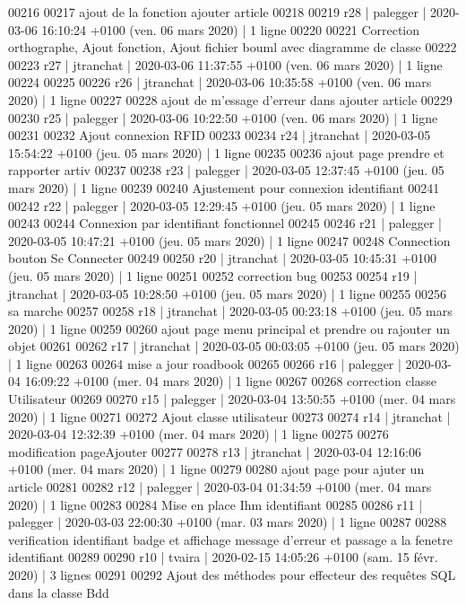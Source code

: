 \begin{DoxyCode}
00216 
00217 ajout de la fonction ajouter article
00218 
00219 r28 | palegger | 2020-03-06 16:10:24 +0100 (ven. 06 mars 2020) | 1 ligne
00220 
00221 Correction orthographe, Ajout fonction, Ajout fichier bouml avec diagramme de classe
00222 
00223 r27 | jtranchat | 2020-03-06 11:37:55 +0100 (ven. 06 mars 2020) | 1 ligne
00224 
00225 
00226 r26 | jtranchat | 2020-03-06 10:35:58 +0100 (ven. 06 mars 2020) | 1 ligne
00227 
00228 ajout de m'essage d'erreur dans ajouter article
00229 
00230 r25 | palegger | 2020-03-06 10:22:50 +0100 (ven. 06 mars 2020) | 1 ligne
00231 
00232 Ajout connexion RFID
00233 
00234 r24 | jtranchat | 2020-03-05 15:54:22 +0100 (jeu. 05 mars 2020) | 1 ligne
00235 
00236 ajout page prendre et rapporter artiv
00237 
00238 r23 | palegger | 2020-03-05 12:37:45 +0100 (jeu. 05 mars 2020) | 1 ligne
00239 
00240 Ajustement pour connexion identifiant
00241 
00242 r22 | palegger | 2020-03-05 12:29:45 +0100 (jeu. 05 mars 2020) | 1 ligne
00243 
00244 Connexion par identifiant fonctionnel
00245 
00246 r21 | palegger | 2020-03-05 10:47:21 +0100 (jeu. 05 mars 2020) | 1 ligne
00247 
00248 Connection bouton Se Connecter
00249 
00250 r20 | jtranchat | 2020-03-05 10:45:31 +0100 (jeu. 05 mars 2020) | 1 ligne
00251 
00252 correction bug
00253 
00254 r19 | jtranchat | 2020-03-05 10:28:50 +0100 (jeu. 05 mars 2020) | 1 ligne
00255 
00256 sa marche
00257 
00258 r18 | jtranchat | 2020-03-05 00:23:18 +0100 (jeu. 05 mars 2020) | 1 ligne
00259 
00260 ajout page menu principal et prendre ou rajouter un objet
00261 
00262 r17 | jtranchat | 2020-03-05 00:03:05 +0100 (jeu. 05 mars 2020) | 1 ligne
00263 
00264 mise a jour roadbook
00265 
00266 r16 | palegger | 2020-03-04 16:09:22 +0100 (mer. 04 mars 2020) | 1 ligne
00267 
00268 correction classe Utilisateur
00269 
00270 r15 | palegger | 2020-03-04 13:50:55 +0100 (mer. 04 mars 2020) | 1 ligne
00271 
00272 Ajout classe utilisateur
00273 
00274 r14 | jtranchat | 2020-03-04 12:32:39 +0100 (mer. 04 mars 2020) | 1 ligne
00275 
00276 modification pageAjouter
00277 
00278 r13 | jtranchat | 2020-03-04 12:16:06 +0100 (mer. 04 mars 2020) | 1 ligne
00279 
00280 ajout page pour ajuter un article
00281 
00282 r12 | palegger | 2020-03-04 01:34:59 +0100 (mer. 04 mars 2020) | 1 ligne
00283 
00284 Mise en place Ihm identifiant
00285 
00286 r11 | palegger | 2020-03-03 22:00:30 +0100 (mar. 03 mars 2020) | 1 ligne
00287 
00288 verification identifiant badge et affichage message d'erreur et passage a la fenetre identifiant
00289 
00290 r10 | tvaira | 2020-02-15 14:05:26 +0100 (sam. 15 févr. 2020) | 3 lignes
00291 
00292 Ajout des méthodes pour effecteur des requêtes SQL dans la classe Bdd

\end{DoxyCode}
